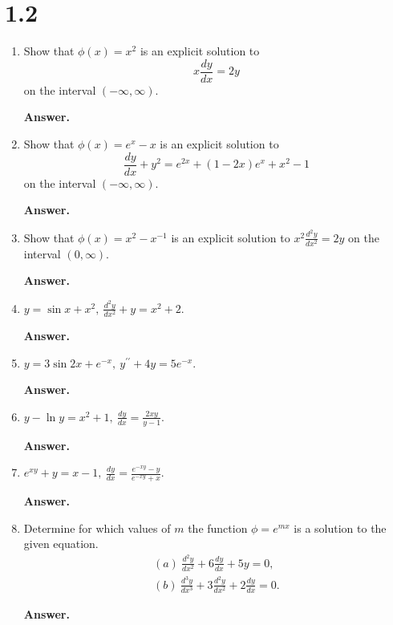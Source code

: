 \documentclass[11pt]{article}
\newenvironment{Question}{%
  \par\noindent\textbf{Answer.}\quad\ignorespaces
}{%
  \par\medskip
}
\begin{document}
\section*{1.2}
\begin{enumerate}
  \item[1.(a)] Show that $\phi(x)=x^{2}$ is an explicit solution to
  $$x\frac{dy}{dx}=2y$$
  on the interval $(-\infty,\infty)$.
  \begin{Question}
  \end{Question}

  \item[(b)] Show that $\phi(x)=e^{x}-x$ is an explicit solution to
  $$\frac{dy}{dx}+y^{2}=e^{2x}+(1-2x)e^{x}+x^{2}-1$$
  on the interval $(-\infty,\infty)$.
  \begin{Question}
  \end{Question}

  \item[(c)] Show that $\phi(x)=x^{2}-x^{-1}$ is an explicit solution to $x^{2}\frac{d^{2}y}{dx^{2}}=2y$ on the interval $(0,\infty)$.
  \begin{Question}
  \end{Question}

  \item[3.] $y=\sin x+x^{2},\ \frac{d^{2}y}{dx^{2}}+y=x^{2}+2$.
  \begin{Question}
  \end{Question}

  \item[8.] $y=3\sin 2x+e^{-x},\ y^{\prime\prime}+4y=5e^{-x}$.
  \begin{Question}
  \end{Question}

  \item[10.] $y-\ln y=x^{2}+1,\ \frac{dy}{dx}=\frac{2xy}{y-1}$.
  \begin{Question}
  \end{Question}

  \item[11.] $e^{xy}+y=x-1,\ \frac{dy}{dx}=\frac{e^{-xy}-y}{e^{-xy}+x}$.
  \begin{Question}
  \end{Question}

  \item[20.] Determine for which values of $m$ the function $\phi=e^{mx}$ is a solution to the given equation.
  $$\begin{array}{l}(a)\ \frac{d^{2}y}{dx^{2}}+6\frac{dy}{dx}+5y=0,\\[6pt](b)\ \frac{d^{3}y}{dx^{3}}+3\frac{d^{2}y}{dx^{2}}+2\frac{dy}{dx}=0.\end{array}$$
  \begin{Question}
  \end{Question}


\end{enumerate}
\end{document}
